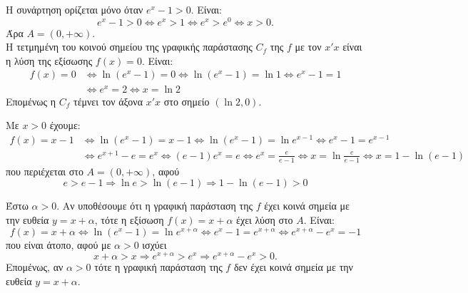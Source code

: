 \begin{alist}
\item Η συνάρτηση ορίζεται μόνο όταν $e^x - 1 > 0$. Είναι:
\[e^x - 1 > 0 \Leftrightarrow e^x > 1 \Leftrightarrow e^x > e^0 \Leftrightarrow x > 0.\]
Άρα $A = (0, +\infty)$. \\
Η τετμημένη του κοινού σημείου της γραφικής παράστασης $C_f$ της $f$ με τον $x'x$ είναι η λύση της εξίσωσης $f(x) = 0$. Είναι:
\begin{align*}
f(x) = 0 &\Leftrightarrow \ln(e^x - 1) = 0 \Leftrightarrow \ln(e^x - 1) = \ln 1 \Leftrightarrow e^x - 1 = 1 \\
&\Leftrightarrow e^x = 2 \Leftrightarrow x = \ln 2
\end{align*}
Επομένως η $C_f$ τέμνει τον άξονα $x'x$ στο σημείο $(\ln 2, 0)$.
\item Με $x > 0$ έχουμε:
\begin{align*}
f(x) = x - 1 &\Leftrightarrow \ln(e^x - 1) = x - 1 \Leftrightarrow \ln(e^x - 1) = \ln e^{x - 1} \Leftrightarrow e^x - 1 = e^{x - 1} \\
&\Leftrightarrow e^{x + 1} - e = e^x \Leftrightarrow (e - 1)e^x = e \Leftrightarrow e^x = \frac{e}{e - 1} \Leftrightarrow x = \ln\frac{e}{e - 1} \Leftrightarrow x = 1 - \ln(e - 1)
\end{align*}
που περιέχεται στο $A = (0, +\infty)$, αφού
\[e > e - 1 \Rightarrow \ln e > \ln(e - 1) \Rightarrow 1 - \ln(e - 1) > 0\]
\item Έστω $\alpha > 0$. Αν υποθέσουμε ότι η γραφική παράσταση της $f$ έχει κοινά σημεία με την ευθεία $y = x + \alpha$, τότε η εξίσωση $f(x) = x + \alpha$ έχει λύση στο $A$. Είναι:
\[f(x) = x + \alpha \Leftrightarrow \ln(e^x - 1) = \ln e^{x + \alpha} \Leftrightarrow e^x - 1 = e^{x + \alpha} \Leftrightarrow e^{x + \alpha} - e^x = -1\]
που είναι άτοπο, αφού με $\alpha > 0$ ισχύει
\[x + \alpha > x \Rightarrow e^{x + \alpha} > e^x \Rightarrow e^{x + \alpha} - e^x > 0.\]
Επομένως, αν $\alpha > 0$ τότε η γραφική παράσταση της $f$ δεν έχει κοινά σημεία με την ευθεία $y = x + \alpha$.
\end{alist}

